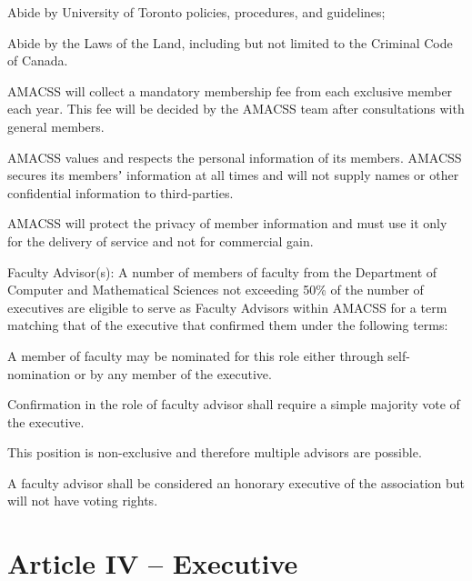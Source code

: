 \documentclass[12pt,a4paper]{article}
\begin{document}
\begin{constitutionlist}
\begin{constitutionlist}
\item Abide by University of Toronto policies, procedures, and guidelines;

\item Abide by the Laws of the Land, including but not limited to the Criminal Code of Canada.
\end{constitutionlist}

\item AMACSS will collect a mandatory membership fee from each exclusive member each year. This fee will be decided by the AMACSS team after consultations with general members.

\item AMACSS values and respects the personal information of its members. AMACSS secures its membersʼ information at all times and will not supply names or other confidential information to third-parties.

\item AMACSS will protect the privacy of member information and must use it only for the delivery of service and not for commercial gain.

\item Faculty Advisor(s): A number of members of faculty from the Department of Computer and Mathematical Sciences not exceeding 50\% of the number of executives are eligible to serve as Faculty Advisors within AMACSS for a term matching that of the executive that confirmed them under the following terms:

\begin{constitutionlist}
\item A member of faculty may be nominated for this role either through self-nomination or by any member of the executive.

\item Confirmation in the role of faculty advisor shall require a simple majority vote of the executive.

\item This position is non-exclusive and therefore multiple advisors are possible.

\item A faculty advisor shall be considered an honorary executive of the association but will not have voting rights.
\end{constitutionlist}
\end{constitutionlist}

\section{Article IV – Executive}
\end{document}
